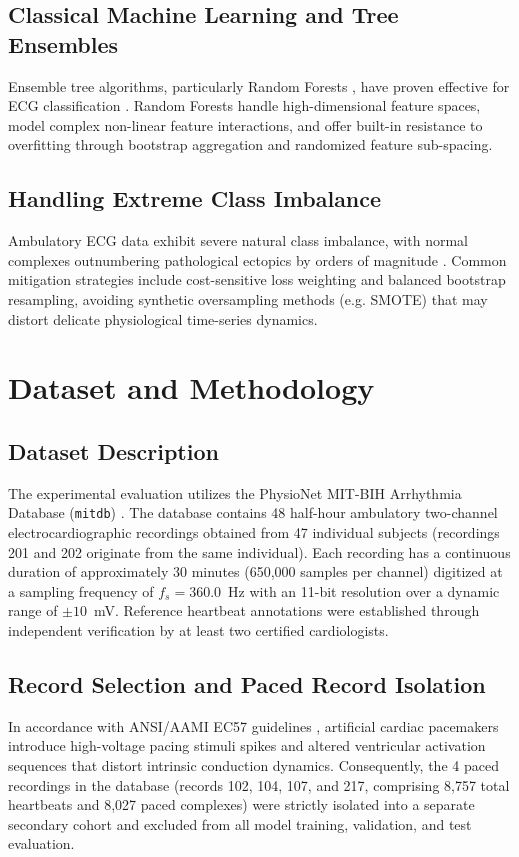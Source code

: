 \documentclass[conference]{IEEEtran}
\begin{document}
\subsection{Classical Machine Learning and Tree Ensembles}
Ensemble tree algorithms, particularly Random Forests \cite{breiman2001random}, have proven effective for ECG classification \cite{mondejar2019heartbeat}. Random Forests handle high-dimensional feature spaces, model complex non-linear feature interactions, and offer built-in resistance to overfitting through bootstrap aggregation and randomized feature sub-spacing.

\subsection{Handling Extreme Class Imbalance}
Ambulatory ECG data exhibit severe natural class imbalance, with normal complexes outnumbering pathological ectopics by orders of magnitude \cite{luz2016ecg}. Common mitigation strategies include cost-sensitive loss weighting \cite{king2001logistic} and balanced bootstrap resampling, avoiding synthetic oversampling methods (e.g. SMOTE) that may distort delicate physiological time-series dynamics.

\section{Dataset and Methodology}

\subsection{Dataset Description}
The experimental evaluation utilizes the PhysioNet MIT-BIH Arrhythmia Database (\texttt{mitdb}) \cite{goldberger2000physiobank}. The database contains 48 half-hour ambulatory two-channel electrocardiographic recordings obtained from 47 individual subjects (recordings 201 and 202 originate from the same individual). Each recording has a continuous duration of approximately 30 minutes (650,000 samples per channel) digitized at a sampling frequency of $f_s = 360.0$~Hz with an 11-bit resolution over a dynamic range of $\pm 10$~mV. Reference heartbeat annotations were established through independent verification by at least two certified cardiologists.

\subsection{Record Selection and Paced Record Isolation}
In accordance with ANSI/AAMI EC57 guidelines \cite{aami1998ec57}, artificial cardiac pacemakers introduce high-voltage pacing stimuli spikes and altered ventricular activation sequences that distort intrinsic conduction dynamics. Consequently, the 4 paced recordings in the database (records 102, 104, 107, and 217, comprising 8,757 total heartbeats and 8,027 paced complexes) were strictly isolated into a separate secondary cohort and excluded from all model training, validation, and test evaluation.
\end{document}
